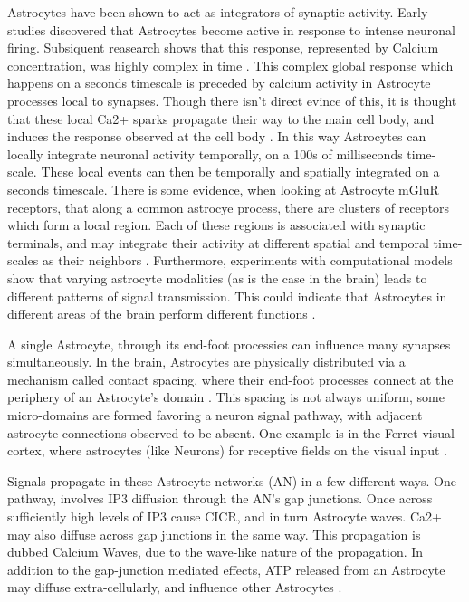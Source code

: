     Astrocytes have been shown to act as integrators of synaptic activity. Early
    studies discovered that Astrocytes become active in response to intense
    neuronal firing. Subsiquent reasearch shows that this response, represented
    by Calcium concentration, was highly complex in time
    \cite{araque_2014}. This complex global response which happens on a seconds 
    timescale is preceded by calcium activity in Astrocyte processes local to
    synapses. Though there isn't direct evince of this, it is thought that these
    local Ca2+ sparks propagate their way to the main cell body, and induces the
    response observed at the cell body \cite{araque_2014}. In this way
    Astrocytes can locally integrate neuronal activity temporally, on a 100s of
    milliseconds time-scale. These local events can then be temporally and
    spatially integrated on a seconds timescale. There is some evidence, when
    looking at Astrocyte mGluR receptors, that along a common astrocye process,
    there are clusters of receptors which form a local region. Each of these
    regions is associated with synaptic terminals, and may integrate their
    activity at different spatial and temporal time-scales as their neighbors
    \cite{pitta_2012}. Furthermore, experiments with computational models show
    that varying astrocyte modalities (as is the case in the brain) leads to
    different patterns of signal transmission. This could indicate that
    Astrocytes in different areas of the brain perform different functions
    \cite{pitta_2012}.

    A single Astrocyte, through its end-foot processies can influence many
    synapses simultaneously. In the brain, Astrocytes are physically distributed
    via a mechanism called contact spacing, where their end-foot processes
    connect at the periphery of an Astrocyte's domain \cite{pitta_2012}. This
    spacing is not always uniform, some micro-domains are formed favoring a
    neuron signal pathway, with adjacent astrocyte connections observed to be
    absent. One example is in the Ferret visual cortex, where astrocytes (like
    Neurons) for receptive fields on the visual input \cite{pitta_2012}.

    Signals propagate in these Astrocyte networks (AN) in a few different ways. One
    pathway, involves IP3 diffusion through the AN's gap junctions. Once across
    sufficiently high levels of IP3 cause CICR, and in turn Astrocyte
    waves. Ca2+ may also diffuse across gap junctions in the same way. This
    propagation is dubbed Calcium Waves, due to the wave-like nature of the
    propagation. In addition to the gap-junction mediated effects, ATP released
    from an Astrocyte may diffuse extra-cellularly, and influence other
    Astrocytes \cite{amiri_2013}.

